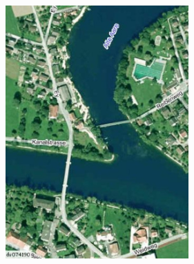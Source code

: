 \documentclass[%
11pt,%
twoside,%
titlepage,%
a4page,%
headsepline%
]{scrartcl}
\begin{document}
\begin{enumerate}
\begin{center}
\includegraphics[width=7cm]{pictures/ueb27lb}
\end{center}


\end{enumerate}
\end{document}
